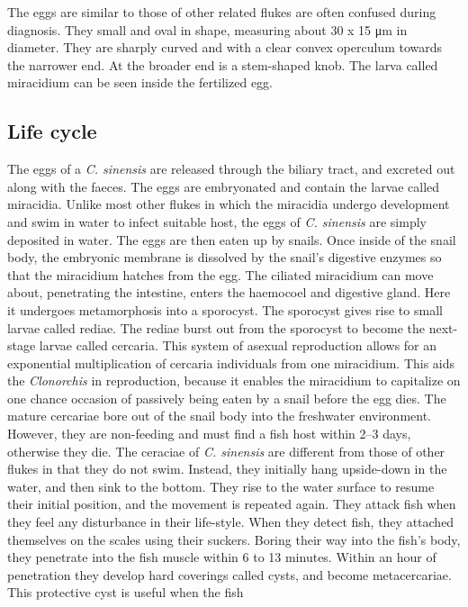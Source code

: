 The eggs are similar to those of other related flukes are often confused
during diagnosis. They small and oval in shape, measuring about 30 x 15
μm in diameter. They are sharply curved and with a clear convex
operculum towards the narrower end. At the broader end is a stem-shaped
knob. The larva called miracidium can be seen inside the fertilized egg.

\subsection{Life cycle}\label{life-cycle-3}

The eggs of a \emph{C. sinensis} are released through the biliary tract,
and excreted out along with the faeces. The eggs are embryonated and
contain the larvae called miracidia. Unlike most other flukes in which
the miracidia undergo development and swim in water to infect suitable
host, the eggs of \emph{C. sinensis} are simply deposited in water. The eggs
are then eaten up by snails. Once inside of the snail body, the
embryonic membrane is dissolved by the snail's digestive enzymes so that
the miracidium hatches from the egg. The ciliated miracidium can move
about, penetrating the intestine, enters the haemocoel and digestive
gland. Here it undergoes metamorphosis into a sporocyst. The sporocyst
gives rise to small larvae called rediae. The rediae burst out from the
sporocyst to become the next-stage larvae called cercaria. This system
of asexual reproduction allows for an exponential multiplication of
cercaria individuals from one miracidium. This aids the \emph{Clonorchis} in
reproduction, because it enables the miracidium to capitalize on one
chance occasion of passively being eaten by a snail before the egg dies.
The mature cercariae bore out of the snail body into the freshwater
environment. However, they are non-feeding and must find a fish host
within 2--3 days, otherwise they die. The ceraciae of \emph{C. sinensis} are
different from those of other flukes in that they do not swim. Instead,
they initially hang upside-down in the water, and then sink to the
bottom. They rise to the water surface to resume their initial position,
and the movement is repeated again. They attack fish when they feel any
disturbance in their life-style. When they detect fish, they attached
themselves on the scales using their suckers. Boring their way into the
fish's body, they penetrate into the fish muscle within 6 to 13 minutes.
Within an hour of penetration they develop hard coverings called cysts,
and become metacercariae. This protective cyst is useful when the fish
